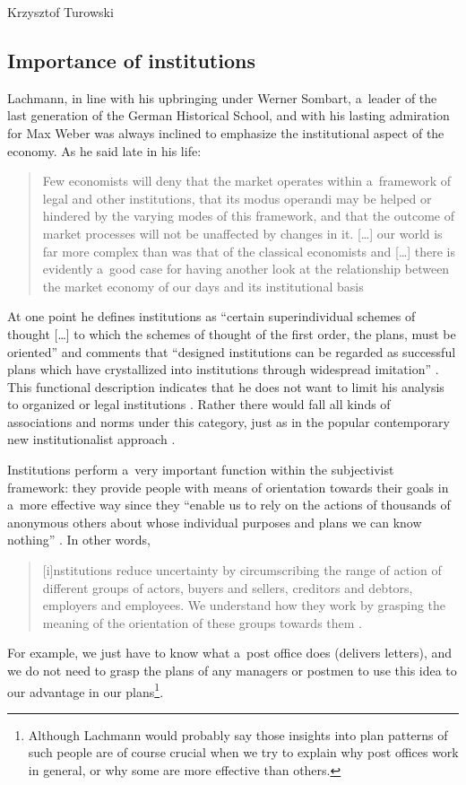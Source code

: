 \begin{artengenv}{Krzysztof Turowski}
\subsection{Importance of institutions}


Lachmann, in line with his upbringing under Werner Sombart, a~leader of the last generation of the German Historical School, and with his lasting admiration for Max Weber was always inclined to emphasize the institutional aspect of the economy. As he said late in his life:
\begin{quote}
Few economists will deny that the market operates within a~framework of legal and other institutions, that its modus operandi may be helped or hindered by the varying modes of this framework, and that the outcome of market processes will not be unaffected by changes in it. [\ldots] our world is far more complex than was that of the classical economists and [\ldots] there is evidently a~good case for having another look at the relationship between the market economy of our days and its institutional basis \parencite[249--250]{lachmann-legislation}
\end{quote}
At one point he defines institutions as ``certain superindividual schemes of thought [\ldots] to which the schemes of thought of the first order, the plans, must be oriented'' \parencite[62]{lachmann-significance} and comments that ``designed institutions can be regarded as successful plans which have crystallized into institutions through widespread imitation'' \parencite[81, 89]{lachmann-mises-process}.
This functional description indicates that he does not want to limit his analysis to organized or legal institutions \parencite[62--63]{lachmann-weber}. Rather there would fall all kinds of associations and norms under this category, just as in the popular contemporary new institutionalist approach \parencite[7--8]{alvesson}.

Institutions perform a~very important function within the subjectivist framework: they provide people with means of orientation towards their goals in a~more effective way since they ``enable us to rely on the actions of thousands of anonymous others about whose individual purposes and plans we can know nothing'' \parencite[49--50]{lachmann-weber}. In other words,
\begin{quote}
[i]nstitutions reduce uncertainty by circumscribing the range of action of different groups of actors, buyers and sellers, creditors and debtors, employers and employees. We understand how they work by grasping the meaning of the orientation of these groups towards them \parencite[277]{lachmann-hermeneutic}.
\end{quote}
For example, we just have to know what a~post office does (delivers letters), and we do not need to grasp the plans of any managers or postmen to use this idea to our advantage in our plans\footnote{Although Lachmann would probably say those insights into plan patterns of such people are of course crucial when we try to explain why post offices work in general, or why some are more effective than others.}.


\end{artengenv}
